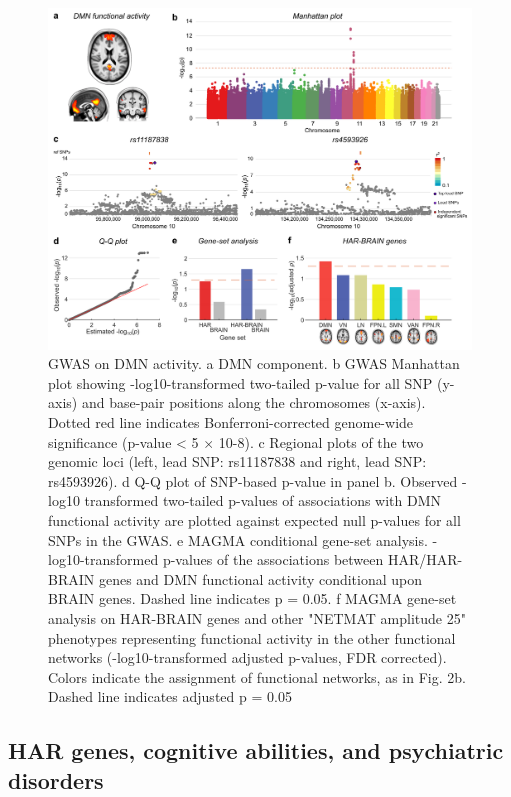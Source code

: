 \begin{refsection}
\begin{figure}[H]
    \centering
    \includegraphics[width=\linewidth]{images/harFig6.png}
    \caption{GWAS on DMN activity. a DMN component. b GWAS Manhattan plot showing -log10-transformed two-tailed p-value for all SNP (y-axis) and base-pair positions along the chromosomes (x-axis). Dotted red line indicates Bonferroni-corrected genome-wide significance (p-value < 5 $\times$ 10-8). c Regional plots of the two genomic loci (left, lead SNP: rs11187838 and right, lead SNP: rs4593926). d Q-Q plot of SNP-based p-value in panel b. Observed -log10 transformed two-tailed p-values of associations with DMN functional activity are plotted against expected null p-values for all SNPs in the GWAS. e MAGMA conditional gene-set analysis. -log10-transformed p-values of the associations between HAR/HAR-BRAIN genes and DMN functional activity conditional upon BRAIN genes. Dashed line indicates p = 0.05. f MAGMA gene-set analysis on HAR-BRAIN genes and other "NETMAT amplitude 25" phenotypes representing functional activity in the other functional networks (-log10-transformed adjusted p-values, FDR corrected). Colors indicate the assignment of functional networks, as in Fig. 2b. Dashed line indicates adjusted p = 0.05}
    \label{harFig6}
\end{figure}

\subsection*{HAR genes, cognitive abilities, and psychiatric disorders}


\end{refsection}
